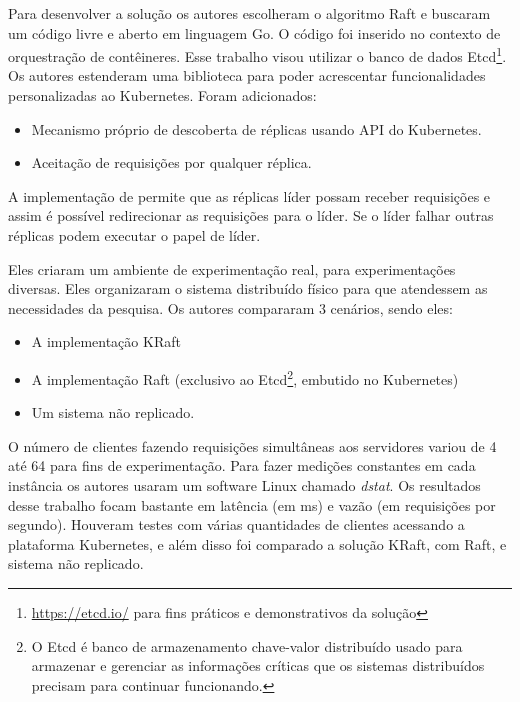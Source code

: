 Para desenvolver a solução os autores escolheram o algoritmo Raft e buscaram um código livre e aberto em linguagem Go. O código foi inserido no contexto de orquestração de contêineres. Esse trabalho visou utilizar o banco de dados Etcd\footnote{\url{https://etcd.io/} para fins práticos e demonstrativos da solução}. Os autores estenderam uma biblioteca para poder acrescentar funcionalidades personalizadas ao Kubernetes. Foram adicionados:

\begin{itemize}
\item Mecanismo próprio de descoberta de réplicas usando API do Kubernetes.
\item Aceitação de requisições por qualquer réplica.
\end{itemize}


A implementação de \textcite{netto2020incorporating} permite que as réplicas líder possam receber requisições e assim é possível redirecionar as requisições para o líder. Se o líder falhar outras réplicas podem executar o papel de líder.


Eles criaram um ambiente de experimentação real, para experimentações diversas. Eles organizaram o sistema distribuído físico para que atendessem as necessidades da pesquisa. Os autores compararam 3 cenários, sendo eles:

\begin{itemize}
\item A implementação KRaft
\item A implementação Raft (exclusivo ao Etcd\footnote{O Etcd é banco de armazenamento chave-valor distribuído usado para armazenar e gerenciar as informações críticas que os sistemas distribuídos precisam para continuar funcionando.}, embutido no Kubernetes)
\item Um sistema não replicado.
\end{itemize}

O número de clientes fazendo requisições simultâneas aos servidores variou de 4 até 64 para fins de experimentação. Para fazer medições constantes em cada instância os autores usaram um software Linux chamado \textit{dstat}. Os resultados desse trabalho focam bastante em latência (em ms) e vazão (em requisições por segundo). Houveram testes com várias quantidades de clientes acessando a plataforma Kubernetes, e além disso foi comparado a solução KRaft, com Raft, e sistema não replicado.

